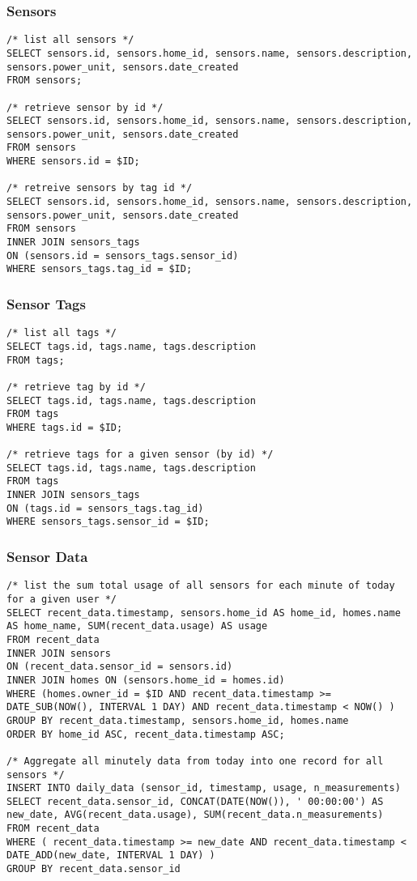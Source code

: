 \documentclass[11pt]{article}
\begin{document}
  \subsubsection{Sensors}
\begin{lstlisting}[style=SQL]
/* list all sensors */
SELECT sensors.id, sensors.home_id, sensors.name, sensors.description, sensors.power_unit, sensors.date_created
FROM sensors;

/* retrieve sensor by id */
SELECT sensors.id, sensors.home_id, sensors.name, sensors.description, sensors.power_unit, sensors.date_created
FROM sensors
WHERE sensors.id = $ID;

/* retreive sensors by tag id */
SELECT sensors.id, sensors.home_id, sensors.name, sensors.description, sensors.power_unit, sensors.date_created
FROM sensors
INNER JOIN sensors_tags
ON (sensors.id = sensors_tags.sensor_id)
WHERE sensors_tags.tag_id = $ID;
\end{lstlisting}

  \subsubsection{Sensor Tags}
\begin{lstlisting}[style=SQL]
/* list all tags */
SELECT tags.id, tags.name, tags.description
FROM tags;

/* retrieve tag by id */
SELECT tags.id, tags.name, tags.description
FROM tags
WHERE tags.id = $ID;

/* retrieve tags for a given sensor (by id) */
SELECT tags.id, tags.name, tags.description
FROM tags
INNER JOIN sensors_tags
ON (tags.id = sensors_tags.tag_id)
WHERE sensors_tags.sensor_id = $ID;
\end{lstlisting}

  \subsubsection{Sensor Data}
\begin{lstlisting}[style=SQL]
/* list the sum total usage of all sensors for each minute of today for a given user */
SELECT recent_data.timestamp, sensors.home_id AS home_id, homes.name AS home_name, SUM(recent_data.usage) AS usage
FROM recent_data
INNER JOIN sensors
ON (recent_data.sensor_id = sensors.id)
INNER JOIN homes ON (sensors.home_id = homes.id)
WHERE (homes.owner_id = $ID AND recent_data.timestamp >= DATE_SUB(NOW(), INTERVAL 1 DAY) AND recent_data.timestamp < NOW() )
GROUP BY recent_data.timestamp, sensors.home_id, homes.name
ORDER BY home_id ASC, recent_data.timestamp ASC;

/* Aggregate all minutely data from today into one record for all sensors */
INSERT INTO daily_data (sensor_id, timestamp, usage, n_measurements)
SELECT recent_data.sensor_id, CONCAT(DATE(NOW()), ' 00:00:00') AS new_date, AVG(recent_data.usage), SUM(recent_data.n_measurements)
FROM recent_data
WHERE ( recent_data.timestamp >= new_date AND recent_data.timestamp < DATE_ADD(new_date, INTERVAL 1 DAY) )
GROUP BY recent_data.sensor_id

\end{lstlisting}  
\end{document}
